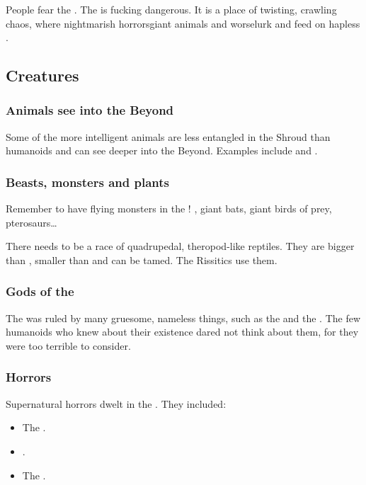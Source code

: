 People fear the \wylde.
The \wylde is fucking dangerous.
It is a place of twisting, crawling chaos, where nightmarish horrors\dash{}giant animals and worse\dash{}lurk and feed on hapless \travelers.









\subsection{Creatures}





\subsubsection{Animals see into the Beyond}
Some of the more intelligent animals are less entangled in the Shroud than humanoids and can see deeper into the Beyond. 
Examples include  and .  





\subsubsection{Beasts, monsters and plants}
Remember to have flying monsters in the \Wylde{}! 
, giant bats, giant birds of prey, pterosaurs\ldots{} 

There needs to be a race of quadrupedal, theropod-like reptiles. 
They are bigger than \nycans, smaller than \cortios{} and can be tamed. 
The Rissitics use them. 





\subsubsection{Gods of the \wylde}
The \wylde was ruled by many gruesome, nameless things, such as the  and the . 
The few humanoids who knew about their existence dared not think about them, for they were too terrible to consider.





\subsubsection{Horrors}
Supernatural horrors dwelt in the \wylde. 
They included:
\begin{itemize}
  \item The . 
  \item {}.
  \item The .
\end{itemize}






